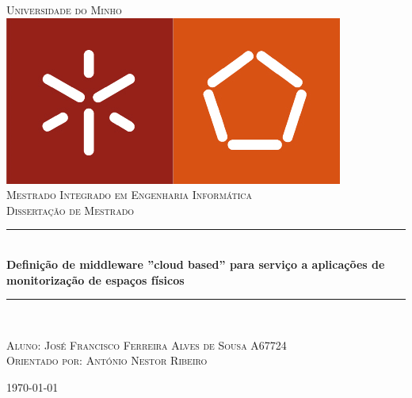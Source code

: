 \begin{titlepage}

\newcommand{\HRule}{\rule{\linewidth}{0.5mm}}

\center


\textsc{\LARGE Universidade do Minho}\\[1cm]
\includegraphics[scale=0.4]{img/logo.png}\\[1cm]
\textsc{\Large Mestrado Integrado em Engenharia Informática}\\[1cm]
\textsc{\Large Dissertação de Mestrado}\\[0.5cm]


{\huge \HRule \\[0.5cm]
\textbf{Definição de middleware ''cloud based'' para serviço a aplicações de monitorização de espaços físicos}
\HRule \\[3cm]}


\begin{flushleft}
\textsc{Aluno: José Francisco Ferreira Alves de Sousa A67724}\\[0.5cm]
\textsc{Orientado por: António Nestor Ribeiro}\\[3cm]
\end{flushleft}


\vfill
{\large \today}\\[3cm] %

\end{titlepage}
